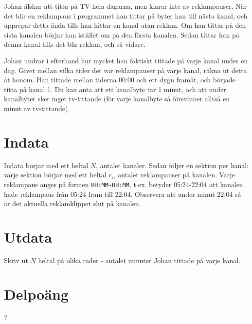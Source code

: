 
Johan älskar att titta på TV hela dagarna, men klarar inte av reklampauser. När det blir en reklampaus i programmet han tittar på byter han till nästa kanal, och upprepar detta ända tills han hittar en kanal utan reklam. Om han tittar på den sista kanalen börjar han istället om på den första kanalen. Sedan tittar han på denna kanal tills det blir reklam, och så vidare.

Johan undrar i efterhand hur mycket han faktiskt tittade på varje kanal under en dag. Givet mellan vilka tider det var reklampauser på varje kanal, räkna ut detta åt honom. Han tittade mellan tiderna 00:00 och ett dygn framåt, och började titta på kanal 1. Du kan anta att ett kanalbyte tar 1 minut, och att under kanalbytet sker inget tv-tittande (för varje kanalbyte så försvinner alltså en minut av tv-tittande).

\section*{Indata}
Indata börjar med ett heltal $N$, antalet kanaler. Sedan följer en sektion per kanal: varje sektion börjar med ett heltal $r_i$, antalet reklampauser på kanalen. Varje reklampaus anges på formen \texttt{HH:MM-HH:MM}, t.ex. betyder 05:24-22:04 att kanalen hade reklampaus från 05:24 fram till 22:04. Observera att under minut 22:04 så är det aktuella reklamklippet slut på kanalen.

\section*{Utdata}
Skriv ut $N$ heltal på olika rader - antalet minuter Johan tittade på varje kanal.

\section*{Delpoäng}
?
